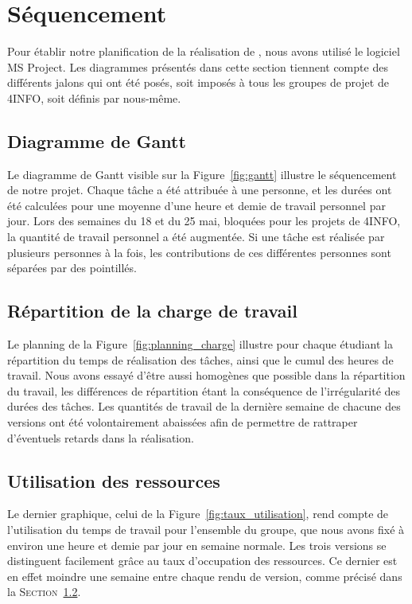 \section{Séquencement}
	\label{sec:sequencement}
	Pour établir notre planification de la réalisation de \glasir{}, nous avons utilisé le logiciel MS Project. Les diagrammes présentés dans cette section tiennent compte des différents jalons qui ont été posés, soit imposés à tous les groupes de projet de 4INFO, soit définis par nous-même.

    \subsection{Diagramme de Gantt}
        Le diagramme de Gantt visible sur la {\sc Figure}~\ref{fig:gantt} illustre le séquencement de notre projet. Chaque tâche a été attribuée à une personne, et les durées ont été calculées pour une moyenne d'une heure et demie de travail personnel par jour. Lors des semaines du 18 et du 25 mai, bloquées pour les projets de 4INFO, la quantité de travail personnel a été augmentée. Si une tâche est réalisée par plusieurs personnes à la fois, les contributions de ces différentes personnes sont séparées par des pointillés.
    
    \subsection{Répartition de la charge de travail}
    \label{subsec:repartition_charge}
        Le planning de la {\sc Figure}~\ref{fig:planning_charge} illustre pour chaque étudiant la répartition du temps de réalisation des tâches, ainsi que le cumul des heures de travail. Nous avons essayé d'être aussi homogènes que possible dans la répartition du travail, les différences de répartition étant la conséquence de l'irrégularité des durées des tâches. Les quantités de travail de la dernière semaine de chacune des versions ont été volontairement abaissées afin de permettre de rattraper d'éventuels retards dans la réalisation.

    \subsection{Utilisation des ressources}
		Le dernier graphique, celui de la {\sc Figure}~\ref{fig:taux_utilisation}, rend compte de l'utilisation du temps de travail pour l'ensemble du groupe, que nous avons fixé à environ une heure et demie par jour en semaine normale. Les trois versions se distinguent facilement grâce au taux d'occupation des ressources. Ce dernier est en effet moindre une semaine entre chaque rendu de version, comme précisé dans la \textsc{Section}~\ref{subsec:repartition_charge}.

